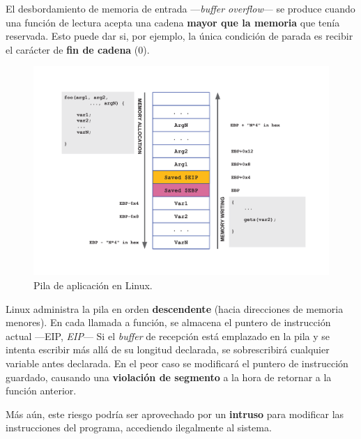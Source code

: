 El desbordamiento de memoria de entrada ---\textit{buffer overflow}--- se produce cuando una función de lectura acepta una cadena \textbf{mayor que la memoria} que tenía reservada. Esto puede dar si, por ejemplo, la única condición de parada es recibir el carácter de \textbf{fin de cadena} (0).

\smallskip

\begin{figure}[H]
	\noindent \begin{centering}
		\includegraphics[width=\linewidth*3/4]{capitulo5/stack}
		\par\end{centering}
	\smallskip
	\caption[Pila de aplicación en Linux]{\label{fig:stack} Pila de aplicación en Linux. \cite{zanero_cs}}
\end{figure} 

\smallskip

Linux administra la pila en orden \textbf{descendente} (hacia direcciones de memoria menores). En cada llamada a función, se almacena el puntero de instrucción actual ---\acrshort{EIP}, \textit{\acrlong{EIP}}--- Si el \textit{buffer} de recepción está emplazado en la pila y se intenta escribir más allá de su longitud declarada, se sobrescribirá cualquier variable antes declarada. En el peor caso se modificará el puntero de instrucción guardado, causando una \textbf{violación de segmento} a la hora de retornar a la función anterior.

Más aún, este riesgo podría ser aprovechado por un \textbf{intruso} para modificar las instrucciones del programa, accediendo ilegalmente al sistema.

\smallskip

